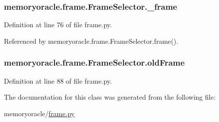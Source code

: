 \subsubsection[{\+\_\+frame}]{\setlength{\rightskip}{0pt plus 5cm}memoryoracle.\+frame.\+Frame\+Selector.\+\_\+frame\hspace{0.3cm}{\ttfamily [private]}}\label{classmemoryoracle_1_1frame_1_1FrameSelector_aba1efcf398054b163a312adc69b9058d}


Definition at line 76 of file frame.\+py.



Referenced by memoryoracle.\+frame.\+Frame\+Selector.\+frame().

\hypertarget{classmemoryoracle_1_1frame_1_1FrameSelector_a7d97514caf35237278ece2f916225c78}{}
\subsubsection[{old\+Frame}]{\setlength{\rightskip}{0pt plus 5cm}memoryoracle.\+frame.\+Frame\+Selector.\+old\+Frame}\label{classmemoryoracle_1_1frame_1_1FrameSelector_a7d97514caf35237278ece2f916225c78}


Definition at line 88 of file frame.\+py.



The documentation for this class was generated from the following file\+:\begin{DoxyCompactItemize}
\item 
memoryoracle/\hyperlink{frame_8py}{frame.\+py}\end{DoxyCompactItemize}
